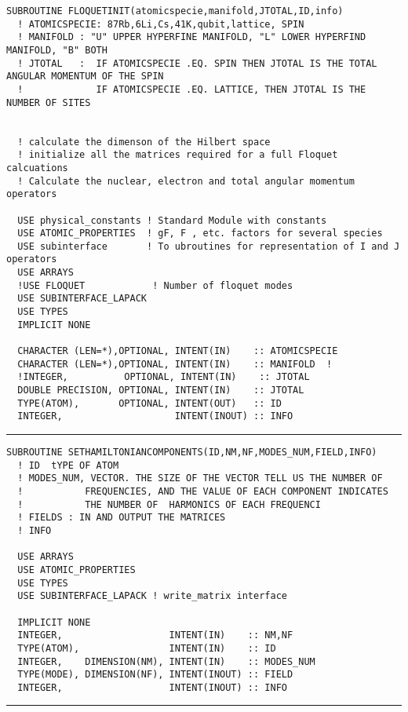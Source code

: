 \documentclass[10pt,a4paper]{article}
\begin{document}
\begin{verbatim}
SUBROUTINE FLOQUETINIT(atomicspecie,manifold,JTOTAL,ID,info)
  ! ATOMICSPECIE: 87Rb,6Li,Cs,41K,qubit,lattice, SPIN
  ! MANIFOLD : "U" UPPER HYPERFINE MANIFOLD, "L" LOWER HYPERFIND MANIFOLD, "B" BOTH
  ! JTOTAL   :  IF ATOMICSPECIE .EQ. SPIN THEN JTOTAL IS THE TOTAL ANGULAR MOMENTUM OF THE SPIN
  !             IF ATOMICSPECIE .EQ. LATTICE, THEN JTOTAL IS THE NUMBER OF SITES


  ! calculate the dimenson of the Hilbert space
  ! initialize all the matrices required for a full Floquet calcuations
  ! Calculate the nuclear, electron and total angular momentum operators

  USE physical_constants ! Standard Module with constants
  USE ATOMIC_PROPERTIES  ! gF, F , etc. factors for several species
  USE subinterface       ! To ubroutines for representation of I and J operators
  USE ARRAYS
  !USE FLOQUET            ! Number of floquet modes
  USE SUBINTERFACE_LAPACK
  USE TYPES
  IMPLICIT NONE

  CHARACTER (LEN=*),OPTIONAL, INTENT(IN)    :: ATOMICSPECIE
  CHARACTER (LEN=*),OPTIONAL, INTENT(IN)    :: MANIFOLD  !
  !INTEGER,          OPTIONAL, INTENT(IN)    :: JTOTAL
  DOUBLE PRECISION, OPTIONAL, INTENT(IN)    :: JTOTAL
  TYPE(ATOM),       OPTIONAL, INTENT(OUT)   :: ID
  INTEGER,                    INTENT(INOUT) :: INFO
\end{verbatim}
\begin{center}
\rule{12cm}{1pt}
\end{center}
\begin{verbatim}
SUBROUTINE SETHAMILTONIANCOMPONENTS(ID,NM,NF,MODES_NUM,FIELD,INFO)
  ! ID  tYPE OF ATOM
  ! MODES_NUM, VECTOR. THE SIZE OF THE VECTOR TELL US THE NUMBER OF 
  !           FREQUENCIES, AND THE VALUE OF EACH COMPONENT INDICATES
  !           THE NUMBER OF  HARMONICS OF EACH FREQUENCI
  ! FIELDS : IN AND OUTPUT THE MATRICES
  ! INFO

  USE ARRAYS
  USE ATOMIC_PROPERTIES
  USE TYPES
  USE SUBINTERFACE_LAPACK ! write_matrix interface

  IMPLICIT NONE
  INTEGER,                   INTENT(IN)    :: NM,NF
  TYPE(ATOM),                INTENT(IN)    :: ID
  INTEGER,    DIMENSION(NM), INTENT(IN)    :: MODES_NUM
  TYPE(MODE), DIMENSION(NF), INTENT(INOUT) :: FIELD
  INTEGER,                   INTENT(INOUT) :: INFO

\end{verbatim}
\begin{center}
\rule{12cm}{1pt}
\end{center}
\end{document}
